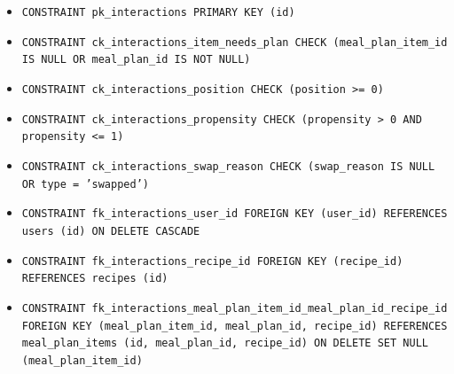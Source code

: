 \begin{itemize}
\item \raggedright {\small\texttt{CONSTRAINT pk\_\allowbreak{}\allowbreak{}interactions PRIMARY KEY (id)}}
\item \raggedright {\small\texttt{CONSTRAINT ck\_\allowbreak{}\allowbreak{}interactions\_\allowbreak{}\allowbreak{}item\_\allowbreak{}\allowbreak{}needs\_\allowbreak{}\allowbreak{}plan CHECK (meal\_\allowbreak{}\allowbreak{}plan\_\allowbreak{}\allowbreak{}item\_\allowbreak{}\allowbreak{}id IS NULL OR meal\_\allowbreak{}\allowbreak{}plan\_\allowbreak{}\allowbreak{}id IS NOT NULL)}}
\item \raggedright {\small\texttt{CONSTRAINT ck\_\allowbreak{}\allowbreak{}interactions\_\allowbreak{}\allowbreak{}position CHECK (position >= 0)}}
\item \raggedright {\small\texttt{CONSTRAINT ck\_\allowbreak{}\allowbreak{}interactions\_\allowbreak{}\allowbreak{}propensity CHECK (propensity > 0 AND propensity <= 1)}}
\item \raggedright {\small\texttt{CONSTRAINT ck\_\allowbreak{}\allowbreak{}interactions\_\allowbreak{}\allowbreak{}swap\_\allowbreak{}\allowbreak{}reason CHECK (swap\_\allowbreak{}\allowbreak{}reason IS NULL OR type = 'swapped')}}
\item \raggedright {\small\texttt{CONSTRAINT fk\_\allowbreak{}\allowbreak{}interactions\_\allowbreak{}\allowbreak{}user\_\allowbreak{}\allowbreak{}id FOREIGN KEY (user\_\allowbreak{}\allowbreak{}id) REFERENCES users (id) ON DELETE CASCADE}}
\item \raggedright {\small\texttt{CONSTRAINT fk\_\allowbreak{}\allowbreak{}interactions\_\allowbreak{}\allowbreak{}recipe\_\allowbreak{}\allowbreak{}id FOREIGN KEY (recipe\_\allowbreak{}\allowbreak{}id) REFERENCES recipes (id)}}
\item \raggedright {\small\texttt{CONSTRAINT fk\_\allowbreak{}\allowbreak{}interactions\_\allowbreak{}\allowbreak{}meal\_\allowbreak{}\allowbreak{}plan\_\allowbreak{}\allowbreak{}item\_\allowbreak{}\allowbreak{}id\_\allowbreak{}\allowbreak{}meal\_\allowbreak{}\allowbreak{}plan\_\allowbreak{}\allowbreak{}id\_\allowbreak{}\allowbreak{}recipe\_\allowbreak{}\allowbreak{}id FOREIGN KEY (meal\_\allowbreak{}\allowbreak{}plan\_\allowbreak{}\allowbreak{}item\_\allowbreak{}\allowbreak{}id, meal\_\allowbreak{}\allowbreak{}plan\_\allowbreak{}\allowbreak{}id, recipe\_\allowbreak{}\allowbreak{}id) REFERENCES meal\_\allowbreak{}\allowbreak{}plan\_\allowbreak{}\allowbreak{}items (id, meal\_\allowbreak{}\allowbreak{}plan\_\allowbreak{}\allowbreak{}id, recipe\_\allowbreak{}\allowbreak{}id) ON DELETE SET NULL (meal\_\allowbreak{}\allowbreak{}plan\_\allowbreak{}\allowbreak{}item\_\allowbreak{}\allowbreak{}id)}}

\end{itemize}
